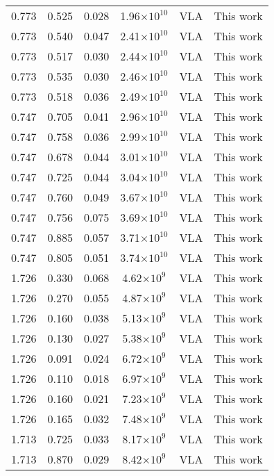 \documentclass{aa}
\begin{document}
{\begin{longtable}{c|c|c|c|c|c}
  0.773 &   0.525   &  0.028 &  1.96$\times 10^{10}$ &  VLA & This work \\
  0.773 &   0.540   &  0.047 &  2.41$\times 10^{10}$ &  VLA & This work \\
  0.773 &   0.517   &  0.030 &  2.44$\times 10^{10}$ &  VLA & This work \\
  0.773 &   0.535   &  0.030 &  2.46$\times 10^{10}$ &  VLA & This work \\
  0.773 &   0.518   &  0.036 &  2.49$\times 10^{10}$ &  VLA & This work \\
  0.747 &   0.705   &  0.041 &  2.96$\times 10^{10}$ &  VLA & This work \\
  0.747 &   0.758   &  0.036 &  2.99$\times 10^{10}$ &  VLA & This work \\
  0.747 &   0.678   &  0.044 &  3.01$\times 10^{10}$ &  VLA & This work \\
  0.747 &   0.725   &  0.044 &  3.04$\times 10^{10}$ &  VLA & This work \\
  0.747 &   0.760   &  0.049 &  3.67$\times 10^{10}$ &  VLA & This work \\
  0.747 &   0.756   &  0.075 &  3.69$\times 10^{10}$ &  VLA & This work \\
  0.747 &   0.885   &  0.057 &  3.71$\times 10^{10}$ &  VLA & This work \\
  0.747 &   0.805   &  0.051 &  3.74$\times 10^{10}$ &  VLA & This work \\
  1.726 &   0.330   &  0.068 &  4.62$\times 10^{9}$  &  VLA & This work \\
  1.726 &   0.270   &  0.055 &  4.87$\times 10^{9}$  &  VLA & This work \\
  1.726 &   0.160   &  0.038 &  5.13$\times 10^{9}$  &  VLA & This work \\
  1.726 &   0.130   &  0.027 &  5.38$\times 10^{9}$  &  VLA & This work \\
  1.726 &   0.091   &  0.024 &  6.72$\times 10^{9}$  &  VLA & This work \\
  1.726 &   0.110   &  0.018 &  6.97$\times 10^{9}$  &  VLA & This work \\
  1.726 &   0.160   &  0.021 &  7.23$\times 10^{9}$  &  VLA & This work \\
  1.726 &   0.165   &  0.032 &  7.48$\times 10^{9}$  &  VLA & This work \\
  1.713 &   0.725   &  0.033 &  8.17$\times 10^{9}$  &  VLA & This work \\
  1.713 &   0.870   &  0.029 &  8.42$\times 10^{9}$  &  VLA & This work \\

\end{longtable}}
\end{document}
